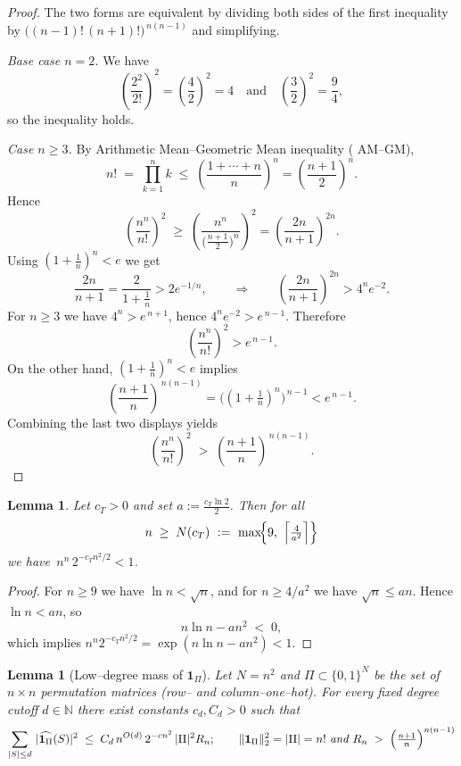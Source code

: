 \documentclass[a4paper,onecolumn,11pt,unpublished]{quantumarticle}
\newtheorem{lemma}[theorem]{Lemma}
\theoremstyle{remark}
\begin{document}
\begin{proof}
The two forms are equivalent by dividing both sides of the first inequality by
$\bigl((n-1)!\,(n+1)!\bigr)^{\,n(n-1)}$ and simplifying.

\emph{Base case $n=2$.} We have
\[
\left(\frac{2^2}{2!}\right)^{\!2}= \left(\frac{4}{2}\right)^2=4
\quad\text{and}\quad
\left(\frac{3}{2}\right)^{2}= \frac{9}{4},
\]
so the inequality holds.

\emph{Case $n\ge 3$.} By Arithmetic Mean–Geometric Mean inequality ( AM--GM),
\[
n!\;=\;\prod_{k=1}^n k \;\le\; \left(\frac{1+\cdots+n}{n}\right)^{\!n}
=\left(\frac{n+1}{2}\right)^{\!n}.
\]
Hence
\[
\left(\frac{n^n}{n!}\right)^{\!2}
\;\ge\;
\left(\frac{n^n}{\bigl(\tfrac{n+1}{2}\bigr)^n}\right)^{\!2}
=
\left(\frac{2n}{n+1}\right)^{\!2n}.
\]
Using $(1+\tfrac{1}{n})^n<e$ we get
\[
\frac{2n}{n+1}
=\frac{2}{1+\tfrac{1}{n}}
> 2e^{-1/n},
\qquad\Rightarrow\qquad
\left(\frac{2n}{n+1}\right)^{\!2n} > 4^n e^{-2}.
\]
For $n\ge 3$ we have $4^n>e^{\,n+1}$, hence $4^n e^{-2}>e^{\,n-1}$. Therefore
\[
\left(\frac{n^n}{n!}\right)^{\!2}
> e^{\,n-1}.
\]
On the other hand, $(1+\tfrac{1}{n})^n<e$ implies
\[
\left(\frac{n+1}{n}\right)^{\,n(n-1)} = \bigl((1+\tfrac{1}{n})^n\bigr)^{\,n-1} < e^{\,n-1}.
\]
Combining the last two displays yields
\[
\left(\frac{n^n}{n!}\right)^{\!2}
\;>\;
\left(\frac{n+1}{n}\right)^{\,n(n-1)}.
\]
\end{proof}

\begin{lemma}
\label{lem:control-ineq}
Let $c_T>0$ and set $a:=\tfrac{c_T\ln 2}{2}$. Then for all
\[
n \;\ge\; N(c_T)\ :=\ \max\!\Bigl\{9,\ \Bigl\lceil \tfrac{4}{a^2}\Bigr\rceil\Bigr\}
\]
we have $\,n^n\,2^{-c_T n^2/2}<1$.
\end{lemma}

\begin{proof}
For $n\ge 9$ we have $\ln n<\sqrt{n}$, and for $n\ge 4/a^2$ we have
$\sqrt{n}\le a n$. Hence $\ln n<a n$, so
\[
n\ln n-a n^2 \;<\; 0,
\]
which implies $n^n 2^{-c_T n^2/2}=\exp(n\ln n-a n^2)<1$.
\end{proof}


\begin{lemma}[Low–degree mass of $\mathbf{1}_\Pi$]
\label{lem:Pi-lowdeg}
Let $N=n^2$ and $\Pi\subset\{0,1\}^{N}$ be the set of $n\times n$ permutation
matrices (row– and column–one–hot). For every fixed degree cutoff $d\in\mathbb{N}$ there exist
constants $c_d,C_d>0$ such that
\[
  \sum_{|S|\le d}\,|\widehat{\mathbf{1}_\Pi}(S)|^2
  \;\le\; C_d\,n^{O(d)}\,2^{-c n^2}\,|\Pi|^2R_n;
  \qquad \|\mathbf{1}_\Pi\|_2^2=|\Pi|=n! \ \textit{and } R_n \;>\; \Bigl(\tfrac{n+1}{n}\Bigr)^{n(n-1)}
\]
\end{lemma}
\end{document}
